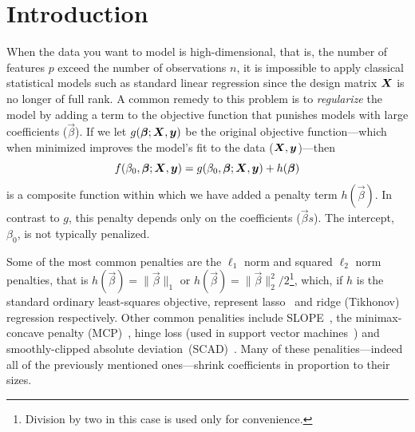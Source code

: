 \section{Introduction}

When the data you want to model is high-dimensional, that is, the number of features \(p\) exceed the number of observations \(n\), it is impossible to apply classical statistical models such as standard linear regression since the design matrix \(\boldsymbol X\) is no longer of full rank. A common remedy to this problem is to \emph{regularize} the model by adding a term to the objective function that punishes models with large coefficients (\(\vec\beta\)). If we let \(g(\boldsymbol\beta; \boldsymbol X, \boldsymbol y)\) be the original objective function---which when minimized improves the model's fit to the data (\(\boldsymbol X, \boldsymbol y\))---then
\[
  f(\beta_0, \boldsymbol\beta; \boldsymbol X, \boldsymbol y) = g(\beta_0, \boldsymbol\beta; \boldsymbol X, \boldsymbol y) + h(\boldsymbol\beta)
\]
is a composite function within which we have added a penalty term \(h(\vec\beta)\).
In contrast to \(g\), this penalty depends only on the coefficients (\(\vec{\beta}s\)).
The intercept, \(\beta_0\), is not typically penalized.

Some of the most common penalties are the \(\ell_1\) norm and squared \(\ell_2\) norm penalties, that is \(h(\vec\beta) = \lVert \vec\beta \rVert_1\) or \(h(\vec\beta) = \lVert \vec\beta \rVert_2^2/2\)\footnote{Division by two in this case is used only for convenience.}, which, if \(h\) is the standard ordinary least-squares objective, represent lasso~\citep{tibshirani1996,santosa1986,donoho1994} and ridge (Tikhonov) regression respectively.
Other common penalities include SLOPE~\citep{bogdan2013,bogdan2015}, the minimax-concave penalty (MCP)~\citep{zhang2010}, hinge loss (used in support vector machines~\citep{cortes1995}) and smoothly-clipped absolute deviation~(SCAD)~\citep{fan2001}.
Many of these penalities---indeed all of the previously mentioned ones---shrink coefficients in proportion to their sizes.


